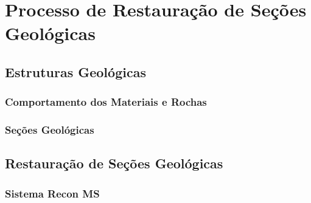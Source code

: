 
\chapter{Processo de Restauração de Seções Geológicas}

\section{Estruturas Geológicas}

\subsection{Comportamento dos Materiais e Rochas}

\subsection{Seções Geológicas}

\section{Restauração de Seções Geológicas}

\subsection{Sistema Recon MS}


